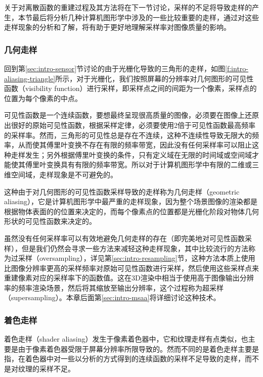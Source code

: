 关于对离散函数的重建过程及其方法将在下一节讨论，采样的不足将导致走样的产生，本节最后将分析几种计算机图形学中涉及的一些比较重要的走样，通过对这些走样现象的分析和了解，将有助于更好地理解采样率对图像质量的影响。




\subsubsection{几何走样}
回到第\ref{sec:intro-sensor}节讨论的由于光栅化导致的三角形的走样，如图\ref{f:intro-aliasing-triangle}所示，对于光栅化，我们按照屏幕的分辨率对几何图形的可见性函数（visibility function）进行采样，即采样点之间的间距为一个像素，采样点的位置为每个像素的中点。

可见性函数是一个连续函数，要想最终呈现很高质量的图像，必须要在图像上还原出很好的原始可见性函数，根据采样定律，必须要使用2倍于可见性函数最高频率的采样率。然而，三角形的可见性总是存在不连续，这种不连续性导致无限大的频率，从而使其傅里叶变换不存在有限的频率带宽，因此没有任何采样率可以阻止这种走样发生；另外根据傅里叶变换的条件，只有定义域在无限的时间域或空间域才能使其傅里叶变换具有有限的频率带宽。所以对于计算机图形学中有限的二维或三维空间域，走样现象是不可避免的。

这种由于对几何图形的可见性函数采样导致的走样称为几何走样（geometric aliasing），它是计算机图形学中最严重的走样现象，因为整个场景图像的渲染都是根据物体表面的的位置来决定的，而每个像素点的位置都是光栅化阶段对物体几何形状的可见性函数来决定的。

虽然没有任何采样率可以有效地避免几何走样的存在（即完美地对可见性函数采样），但是我们仍然会寻求一些方法来减轻这种走样现象，其中比较流行的方法称为过采样（oversampling），详见第\ref{sec:intro-resampling}节，这种方法本质上使用比图像分辨率更高的采样频率对原始可见性函数进行采样，然后使用这些采样点来重建像素对应的采样率下的函数值。这在3D渲染中相当于使用高于图像输出分辨率的频率渲染场景，然后将其缩放至输出分辨率，这个过程称为超采样（supersampling）。本章后面第\ref{sec:intro-msaa}将详细讨论这种技术。




\subsubsection{着色走样}
着色走样（shader aliasing）发生于像素着色器中，它和纹理走样有点类似，也主要是由于像素着色器受限于屏幕分辨率所限导致的。然而不同的是着色走样主要是指，在着色器中对一些以分析的方式得到的连续函数的采样不足导致的走样，而不是对纹理的采样不足。

